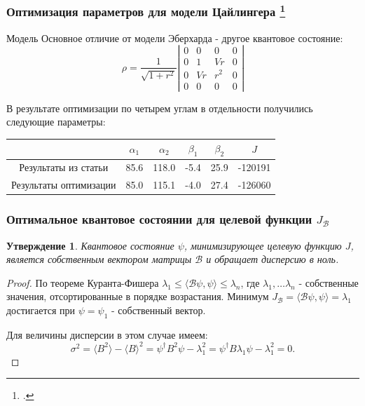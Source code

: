 \documentclass[11pt,pdf,hyperref={unicode}]{beamer}
\newtheorem{mytheorem}{Утверждение}
\theoremstyle{definition}
\begin{document}
\begin{frame}
\frametitle{Оптимизация параметров для модели Цайлингера \footcite{Zeilinger}}
\begin{block}{Модель}
Основное отличие от модели Эберхарда - другое квантовое состояние:
\[
\rho = \frac{1}{\sqrt{1+r^2}}\left|
\begin{smallmatrix}
0 & 0 & 0 & 0\\
0 & 1 & Vr & 0\\
0 & Vr & r^2 & 0\\
0 & 0 & 0 & 0
\end{smallmatrix}\right|
\]
\end{block}

В результате оптимизации по четырем углам в отдельности получились следующие параметры:

\begin{tabular}{|c|c|c|c|c|c|}
\hline 
 & $\alpha_1$ & $\alpha_2$ & $\beta_1$ & $\beta_2$ & $J$ \\ 
\hline 
Результаты из статьи & 85.6 & 118.0 & -5.4 & 25.9 & -120191 \\ 
\hline 
Результаты оптимизации & 85.0 & 115.1 & -4.0 & 27.4 & -126060 \\ 
\hline 
\end{tabular}
\end{frame}

\begin{frame}
\frametitle{Оптимальное квантовое состоянии для целевой функции $J_\mathcal{B}$}
\begin{mytheorem}
Квантовое состояние $\psi$, минимизирующее целевую функцию $J$, является собственным вектором матрицы $\mathcal{B}$ и обращает дисперсию в ноль.
\end{mytheorem}
\begin{proof}
По теореме Куранта-Фишера $\lambda_1 \leq \langle\mathcal{B}\psi, \psi\rangle \leq \lambda_n$, где $\lambda_1, \ldots \lambda_n$ - собственные значения, отсортированные в порядке возрастания. Минимум $J_\mathcal{B} = \langle\mathcal{B}\psi, \psi\rangle = \lambda_1$ достигается при $\psi = \psi_1$ - собственный вектор. 

Для величины дисперсии в этом случае имеем:
\[\sigma^2 = \langle B^2\rangle - \langle B\rangle^2 = \psi^\dagger B^2 \psi - \lambda_1^2 = \psi^\dagger B \lambda_1  \psi - \lambda_1^2 = 0.
\]

\end{proof}
\end{frame}
\end{document}
